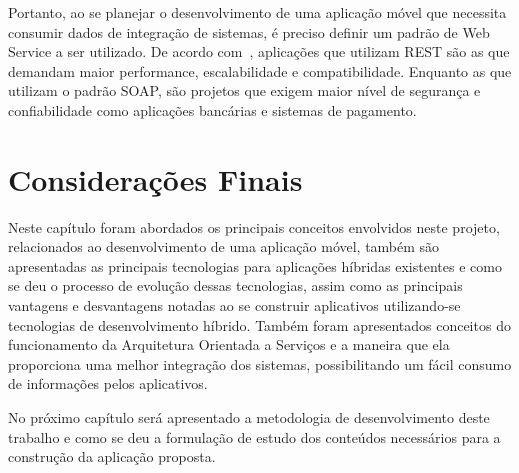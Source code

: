 Portanto, ao se planejar o desenvolvimento de uma aplicação móvel que necessita consumir dados de integração de sistemas, é preciso definir um padrão de Web Service a ser utilizado.
De acordo com~\cite{tihomirovs2016webservices}, aplicações que utilizam REST são as que demandam maior performance, escalabilidade e compatibilidade.
Enquanto as que utilizam o padrão SOAP, são projetos que exigem maior nível de segurança e confiabilidade como aplicações bancárias e sistemas de pagamento.


\section{Considerações Finais}\label{sec:consideracoes-finais}

Neste capítulo foram abordados os principais conceitos envolvidos neste projeto, relacionados ao desenvolvimento de uma aplicação móvel, também são apresentadas as principais tecnologias para aplicações híbridas existentes e como se deu o processo de evolução dessas tecnologias, assim como as principais vantagens e desvantagens notadas ao se construir aplicativos utilizando-se tecnologias de desenvolvimento híbrido.
Também foram apresentados conceitos do funcionamento da Arquitetura Orientada a Serviços e a maneira que ela proporciona uma melhor integração dos sistemas, possibilitando um fácil consumo de informações pelos aplicativos.

No próximo capítulo será apresentado a metodologia de desenvolvimento deste trabalho e como se deu a formulação de estudo dos conteúdos necessários para a construção da aplicação proposta.